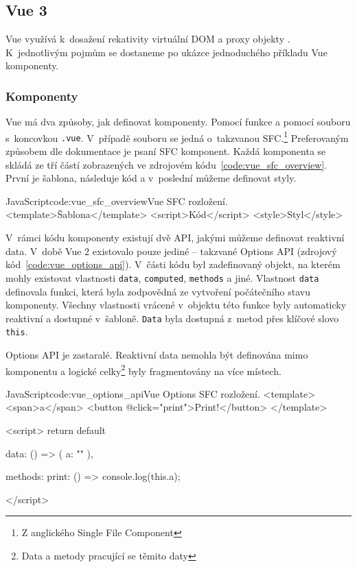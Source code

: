 \documentclass[
  master,
  program=ainf,
  tables=false,
  sourcecodes,
  glossaries,
  index
]{kidiplom}
\begin{document}
\subsection{Vue 3}
Vue \cite{vue} využívá k~dosažení rekativity virtuální DOM a proxy objekty \cite{proxy}. K~jednotlivým
pojmům se dostaneme po ukázce jednoduchého příkladu Vue komponenty.

\subsubsection{Komponenty}
Vue \cite{vue} má dva způsoby, jak definovat komponenty. Pomocí funkce a pomocí souboru 
s~koncovkou {\tt .vue}. V~případě souboru se jedná o~takzvanou SFC.\footnote{Z anglického Single File Component}
Preferovaným způsobem dle dokumentace je psaní SFC komponent. Každá komponenta se skládá ze tří částí
zobrazených ve zdrojovém kódu~\ref{code:vue_sfc_overview}. První je šablona,
následuje kód a v~poslední můžeme definovat styly.

\begin{kicode}{JavaScript}{code:vue_sfc_overview}{Vue SFC rozložení.}
  <template>Šablona</template>
  <script>Kód</script>
  <style>Styl</style>
\end{kicode}

V~rámci kódu komponenty existují dvě API, jakými můžeme definovat reaktivní
data. V~době Vue 2 \cite{vue2} existovalo pouze jediné -- takzvané Options API (zdrojový kód~\ref{code:vue_options_api}). V~části kódu
byl zadefinovaný objekt, na kterém mohly existovat vlastnosti {\tt data}, {\tt computed},
{\tt methods} a jiné. Vlastnost {\tt data} definovala funkci, která byla zodpovědná ze
vytvoření počátečního stavu komponenty. Všechny vlastnosti vrácené v~objektu
této funkce byly automaticky reaktivní a dostupné v~šabloně. {\tt Data} byla dostupná
z~metod přes klíčové slovo {\tt this}.

Options API je zastaralé. Reaktivní data nemohla být definována mimo komponentu
a logické celky\footnote{Data a metody pracující se těmito daty} byly 
fragmentovány na více místech. 

  \begin{kicode}{JavaScript}{code:vue_options_api}{Vue Options SFC rozložení.}
    <template>
      <span>{{a}}</span>
      <button @click="print">Print!</button>
    </template>
  
    <script>
      return default {
        data: () => ({
          a: ""
        }),
  
        methods: {
          print: () => {
            console.log(this.a);
          }
        }
      }
    </script>
  \end{kicode}
\end{document}
